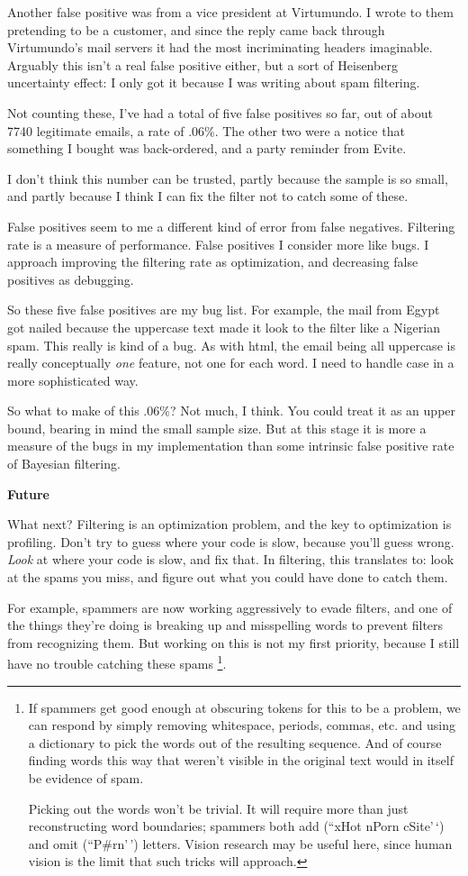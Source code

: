 \documentclass[12pt]{book}
\begin{document}
Another false positive was from a vice president at Virtumundo. I wrote
to them pretending to be a customer, and since the reply came back
through Virtumundo's mail servers it had the most incriminating headers
imaginable. Arguably this isn't a real false positive either, but a sort
of Heisenberg uncertainty effect: I only got it because I was writing
about spam filtering.

Not counting these, I've had a total of five false positives so far, out
of about 7740 legitimate emails, a rate of .06\%. The other two were a
notice that something I bought was back-ordered, and a party reminder
from Evite.

I don't think this number can be trusted, partly because the sample is
so small, and partly because I think I can fix the filter not to catch
some of these.

False positives seem to me a different kind of error from false
negatives. Filtering rate is a measure of performance. False positives I
consider more like bugs. I approach improving the filtering rate as
optimization, and decreasing false positives as debugging.

So these five false positives are my bug list. For example, the mail
from Egypt got nailed because the uppercase text made it look to the
filter like a Nigerian spam. This really is kind of a bug. As with html,
the email being all uppercase is really conceptually \emph{one} feature,
not one for each word. I need to handle case in a more sophisticated
way.

So what to make of this .06\%? Not much, I think. You could treat it as
an upper bound, bearing in mind the small sample size. But at this stage
it is more a measure of the bugs in my implementation than some
intrinsic false positive rate of Bayesian filtering.

\textbf{Future}

What next? Filtering is an optimization problem, and the key to
optimization is profiling. Don't try to guess where your code is slow,
because you'll guess wrong. \emph{Look} at where your code is slow, and
fix that. In filtering, this translates to: look at the spams you miss,
and figure out what you could have done to catch them.

For example, spammers are now working aggressively to evade filters, and
one of the things they're doing is breaking up and misspelling words to
prevent filters from recognizing them. But working on this is not my
first priority, because I still have no trouble catching these spams
\footnote{If spammers get good enough at obscuring tokens for this to be
a problem, we can respond by simply removing whitespace, periods,
commas, etc. and using a dictionary to pick the words out of the
resulting sequence. And of course finding words this way that weren't
visible in the original text would in itself be evidence of spam.

Picking out the words won't be trivial. It will require more than just
reconstructing word boundaries; spammers both add (``xHot nPorn
cSite'\,`) and omit (``P\#rn'\,') letters. Vision research may be useful
here, since human vision is the limit that such tricks will approach.}.
\end{document}

